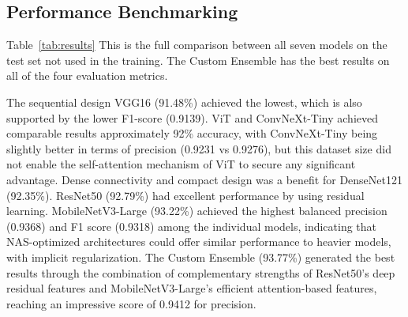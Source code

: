 \documentclass[conference]{IEEEtran}
\begin{document}
{{\subsection{Performance Benchmarking}

Table~\ref{tab:results} This is the full comparison between all seven models on the test set not used in the training. The Custom Ensemble has the best results on all of the four evaluation metrics.

\begin{table}[!ht]
    \centering
    \caption{Performance comparison of all benchmarked models on the held-out test set.}
    \label{tab:results}
\end{table}

The sequential design VGG16 (91.48\%) achieved the lowest, which is also supported by the lower F1-score (0.9139). ViT and ConvNeXt-Tiny achieved comparable results approximately 92\% accuracy, with ConvNeXt-Tiny being slightly better in terms of precision (0.9231 vs 0.9276), but this dataset size did not enable the self-attention mechanism of ViT to secure any significant advantage. Dense connectivity and compact design was a benefit for DenseNet121 (92.35\%). ResNet50 (92.79\%) had excellent performance by using residual learning. MobileNetV3-Large (93.22\%) achieved the highest balanced precision (0.9368) and F1 score (0.9318) among the individual models, indicating that NAS-optimized architectures could offer similar performance to heavier models, with implicit regularization. The Custom Ensemble (93.77\%) generated the best results through the combination of complementary strengths of ResNet50's deep residual features and MobileNetV3-Large's efficient attention-based features, reaching an impressive score of 0.9412 for precision.

}}
\end{document}
